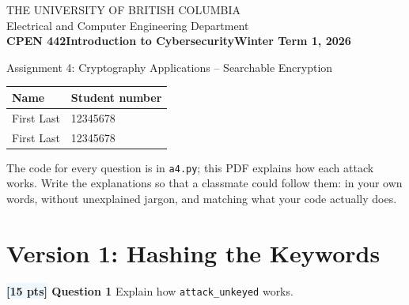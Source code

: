 \documentclass[12pt]{article}
\newcommand{\question}[2]{\textbf{\colorbox{aliceblue}{[#2 pts]} Question #1}}
\begin{document}
\begin{center}
    THE UNIVERSITY OF BRITISH COLUMBIA\\
    Electrical and Computer Engineering Department\\[\baselineskip]
    {\bf CPEN 442\hfill Introduction to Cybersecurity\hfill Winter Term 1, 2026}
    \vspace{1cm}

    {\sc \Large Assignment 4: Cryptography Applications -- Searchable Encryption}
\end{center}

\begin{tabularx}{\textwidth}{|X|l|}
    \hline
    \rowcolor{gray!15} \textbf{Name} & \textbf{Student number} \\
    \hline
    First Last & 12345678 \\
    \hline
    First Last & 12345678 \\
    \hline
\end{tabularx}

The code for every question is in \texttt{a4.py}; this PDF explains how each attack works.
Write the explanations so that a classmate could follow them: in your own words, without unexplained jargon, and matching what your code actually does.

\section{Version 1: Hashing the Keywords}

\question{1}{15} Explain how \texttt{attack\_unkeyed} works.
\end{document}

